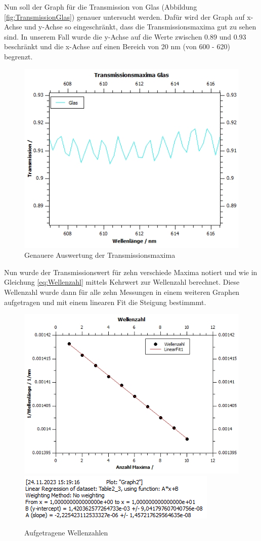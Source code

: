 \documentclass[12pt,a4paper,twoside]{article}
\begin{document}
\noindent
Nun soll der Graph für die Transmission von Glas (Abbildung \ref{fig:TransmissionGlas}) genauer untersucht werden. 
Dafür wird der Graph auf x-Achse und y-Achse so eingeschränkt, dass die Transmissionsmaxima gut zu sehen sind. In unserem Fall wurde die y-Achse auf die Werte zwischen 0.89 und 0.93 beschränkt und die x-Achse auf einen Bereich von 20 nm (von 600 - 620) begrenzt.

\begin{figure}[H]
    \centering
    \includegraphics[width=0.6\linewidth]{nudes/qti-Transmissionsmaxima-Glas.jpg}
    \caption{Genauere Auswertung der Transmissionsmaxima}
    \label{fig:Transmissionsmaxima}
\end{figure}

\noindent
Nun wurde der Transmissionswert für zehn verschiede Maxima notiert und wie in Gleichung \ref{eq:Wellenzahl} mittels Kehrwert zur Wellenzahl berechnet.
Diese Wellenzahl wurde dann für alle zehn Messungen in einem weiteren Graphen aufgetragen und mit einem linearen Fit die Steigung bestimmmt.

\begin{figure}[H]
    \centering
    \includegraphics[width=0.4\linewidth]{nudes/qti-SteigungWellenzahl.jpg}
    \includegraphics[width=0.4\linewidth]{nudes/WellenzahlSteigung.png}
    \caption{Aufgetragene Wellenzahlen}
    \label{fig:WellenzahlSteigung}
\end{figure}
\end{document}
